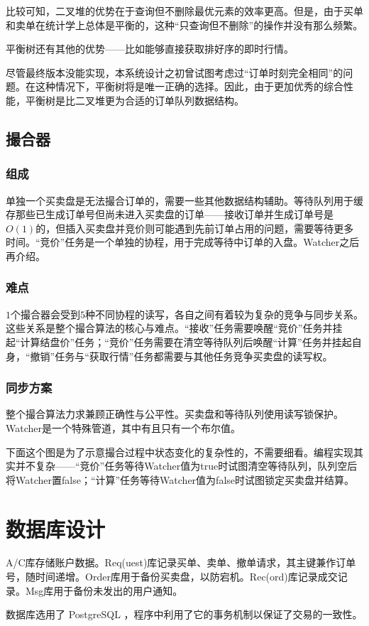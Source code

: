 \documentclass{ctexrep}
\begin{document}
比较可知，二叉堆的优势在于查询但不删除最优元素的效率更高。但是，由于买单和卖单在统计学上总体是平衡的，这种“只查询但不删除”的操作并没有那么频繁。

平衡树还有其他的优势——比如能够直接获取排好序的即时行情。

尽管最终版本没能实现，本系统设计之初曾试图考虑过“订单时刻完全相同”的问题。在这种情况下，平衡树将是唯一正确的选择。因此，由于更加优秀的综合性能，平衡树是比二叉堆更为合适的订单队列数据结构。

\section{撮合器}
\subsection{组成}
单独一个买卖盘是无法撮合订单的，需要一些其他数据结构辅助。等待队列用于缓存那些已生成订单号但尚未进入买卖盘的订单——接收订单并生成订单号是$O(1)$的，但插入买卖盘并竞价则可能遇到先前订单占用的问题，需要等待更多时间。“竞价”任务是一个单独的协程，用于完成等待中订单的入盘。Watcher之后再介绍。

\subsection{难点}
$1$个撮合器会受到$5$种不同协程的读写，各自之间有着较为复杂的竞争与同步关系。这些关系是整个撮合算法的核心与难点。“接收”任务需要唤醒“竞价”任务并挂起“计算结盘价”任务；“竞价”任务需要在清空等待队列后唤醒“计算”任务并挂起自身，“撤销”任务与“获取行情”任务都需要与其他任务竞争买卖盘的读写权。

\subsection{同步方案}
整个撮合算法力求兼顾正确性与公平性。买卖盘和等待队列使用读写锁保护。Watcher是一个特殊管道，其中有且只有一个布尔值。

下面这个图是为了示意撮合过程中状态变化的复杂性的，不需要细看。编程实现其实并不复杂——“竞价”任务等待Watcher值为true时试图清空等待队列，队列空后将Watcher置false；“计算”任务等待Watcher值为false时试图锁定买卖盘并结算。

\chapter{数据库设计}
A/C库存储账户数据。Req(uest)库记录买单、卖单、撤单请求，其主键兼作订单号，随时间递增。Order库用于备份买卖盘，以防宕机。Rec(ord)库记录成交记录。Msg库用于备份未发出的用户通知。

数据库选用了 PostgreSQL ，程序中利用了它的事务机制以保证了交易的一致性。
\end{document}
